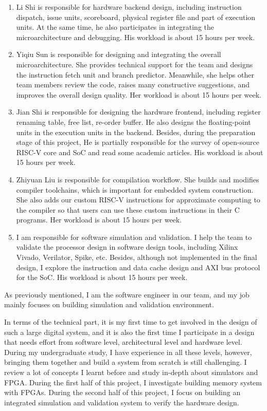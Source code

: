 \begin{enumerate}
  \item Li Shi is responsible for hardware backend design, including instruction dispatch, issue units, scoreboard, physical register file and part of execution units. At the same time, he also participates in integrating the microarchitecture and debugging. His workload is about 15 hours per week.
  \item Yiqiu Sun is responsible for designing and integrating the overall microarchitecture. She provides technical support for the team and designs the instruction fetch unit and branch predictor. Meanwhile, she helps other team members review the code, raises many constructive suggestions, and improves the overall design quality. Her workload is about 15 hours per week.
  \item Jian Shi is responsible for designing the hardware frontend, including register renaming table, free list, re-order buffer. He also designs the floating-point units in the execution units in the backend. Besides, during the preparation stage of this project, He is partially responsible for the survey of open-source RISC-V core and SoC and read some academic articles. His workload is about 15 hours per week.
  \item Zhiyuan Liu is responsible for compilation workflow. She builds and modifies compiler toolchains, which is important for embedded system construction. She also adds our custom RISC-V instructions for approximate computing to the compiler so that users can use these custom instructions in their C programs. Her workload is about 15 hours per week.
  \item I am responsible for software simulation and validation. I help the team to validate the processor design in software design tools, including Xilinx Vivado, Verilator, Spike, etc. Besides, although not implemented in the final design, I explore the instruction and data cache design and AXI bus protocol for the SoC. His workload is about 15 hours per week.
\end{enumerate}

As previously mentioned, I am the software engineer in our team, and my job mainly focuses on building simulation and validation environment.

In terms of the technical part, it is my first time to get involved in the design of such a large digital system, and it is also the first time I participate in a design that needs effort from software level, architectural level and hardware level. During my undergraduate study, I have experience in all these levels, however, bringing them together and build a system from scratch is still challenging. I review a lot of concepts I learnt before and study in-depth about simulators and FPGA. During the first half of this project, I investigate building memory system with FPGAs. During the second half of this project, I focus on building an integrated simulation and validation system to verify the hardware design.

